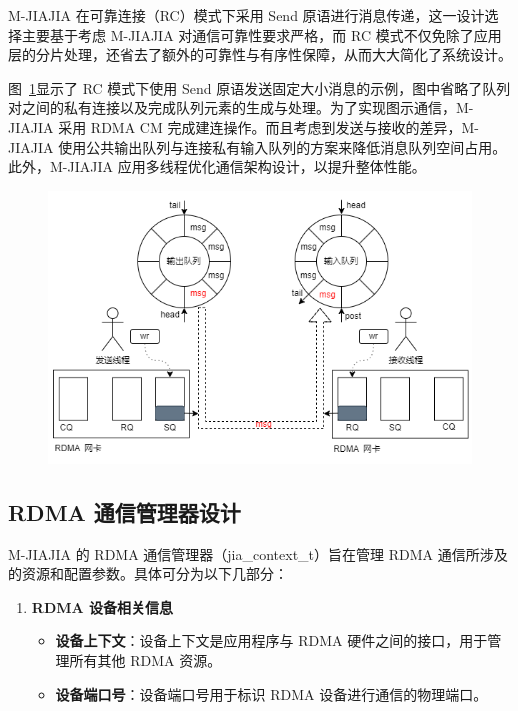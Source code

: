{M-JIAJIA 在可靠连接（RC）模式下采用 Send 原语进行消息传递，这一设计选择主要基于考虑 
M-JIAJIA 对通信可靠性要求严格，而 RC 模式不仅免除了应用层的分片处理，还省去了额外的可靠性与有序性保障，从而大大简化了系统设计。

图~\ref{fig:mjiajia-send-recv}显示了 RC 模式下使用 Send 原语发送固定大小消息的示例，图中省略了队列对之间的私有连接以及完成队列元素的生成与处理。为了实现图示通信，M-JIAJIA 采用 RDMA CM 完成建连操作。而且考虑到发送与接收的差异，M-JIAJIA 使用公共输出队列与连接私有输入队列的方案来降低消息队列空间占用。此外，M-JIAJIA 应用多线程优化通信架构设计，以提升整体性能。
\begin{figure}[H]
    \centering
    \includegraphics[width=\textwidth]{Img/RDMA-send-receive.png}
    \label{fig:mjiajia-send-recv}
\end{figure}



\subsection{RDMA 通信管理器设计}

M-JIAJIA 的 RDMA 通信管理器（jia\_context\_t）旨在管理 RDMA 通信所涉及的资源和配置参数。具体可分为以下几部分：

\begin{enumerate}[label=\arabic*., leftmargin=1em, align=left]
    \item \textbf{RDMA 设备相关信息}
        \begin{itemize}
            \item \textbf{设备上下文}：设备上下文是应用程序与 RDMA 硬件之间的接口，用于管理所有其他 RDMA 资源。
            \item \textbf{设备端口号}：设备端口号用于标识 RDMA 设备进行通信的物理端口。
        \end{itemize}


\end{enumerate}}

